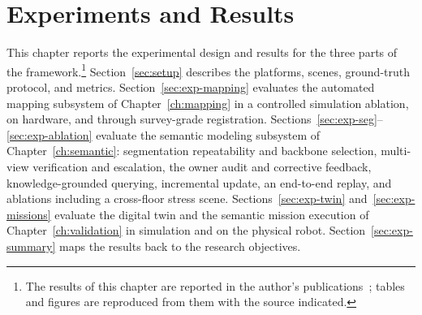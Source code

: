\chapter{Experiments and Results}
\label{ch:experiments}
This chapter reports the experimental design and results for the three parts
of the framework.\footnote{The results of this chapter are reported in the author's publications~\cite{iccas2026,kim2026sensors,kim2026ictc,kim2026electronics,raaicon2026}; tables and figures are reproduced from them with the source indicated.} Section~\ref{sec:setup} describes the platforms, scenes,
ground-truth protocol, and metrics. Section~\ref{sec:exp-mapping} evaluates
the automated mapping subsystem of Chapter~\ref{ch:mapping} in a controlled
simulation ablation, on hardware, and through survey-grade registration.
Sections~\ref{sec:exp-seg}--\ref{sec:exp-ablation} evaluate the semantic
modeling subsystem of Chapter~\ref{ch:semantic}: segmentation repeatability
and backbone selection, multi-view verification and escalation, the owner
audit and corrective feedback, knowledge-grounded querying, incremental update,
an end-to-end replay, and ablations including a cross-floor stress scene.
Sections~\ref{sec:exp-twin} and~\ref{sec:exp-missions} evaluate the digital
twin and the semantic mission execution of Chapter~\ref{ch:validation} in
simulation and on the physical robot. Section~\ref{sec:exp-summary} maps the
results back to the research objectives.




